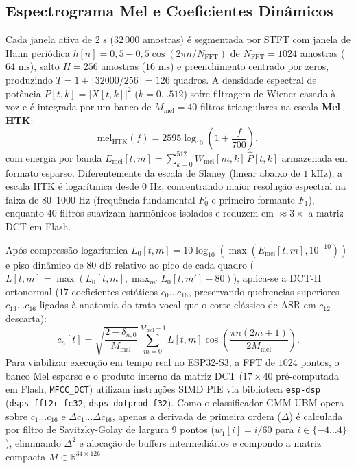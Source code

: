 \documentclass[9pt,technote,a4paper]{IEEEtran}
\begin{document}
\subsection{Espectrograma Mel e Coeficientes Dinâmicos}
Cada janela ativa de $2\text{ s}$ ($32\,000$ amostras) é segmentada por STFT com janela de Hann periódica $h[n] = 0{,}5 - 0{,}5\cos(2\pi n / N_{\mathrm{FFT}})$ de $N_{\mathrm{FFT}} = 1024$ amostras ($64\text{ ms}$), salto $H = 256$ amostras ($16\text{ ms}$) e preenchimento centrado por zeros, produzindo $T = 1 + \lfloor 32000/256 \rfloor = 126$ quadros. A densidade espectral de potência $P[t, k] = |X[t, k]|^2$ ($k = 0\dots 512$) sofre filtragem de Wiener casada à voz e é integrada por um banco de $M_{\mathrm{mel}} = 40$ filtros triangulares na escala \textbf{Mel HTK}:
\begin{equation}
    \mathrm{mel}_{\mathrm{HTK}}(f) = 2595 \log_{10}\!\left(1 + \frac{f}{700}\right),
\end{equation}
com energia por banda $E_{\mathrm{mel}}[t, m] = \sum_{k=0}^{512} W_{\mathrm{mel}}[m, k]\, \hat{P}[t, k]$ armazenada em formato esparso. Diferentemente da escala de Slaney (linear abaixo de $1\text{ kHz}$), a escala HTK é logarítmica desde $0\text{ Hz}$, concentrando maior resolução espectral na faixa de $80\text{--}1000\text{ Hz}$ (frequência fundamental $F_0$ e primeiro formante $F_1$), enquanto $40$ filtros suavizam harmônicos isolados e reduzem em $\approx 3\times$ a matriz DCT em Flash.

Após compressão logarítmica $L_0[t,m] = 10\log_{10}(\max(E_{\mathrm{mel}}[t,m], 10^{-10}))$ e piso dinâmico de $80\text{ dB}$ relativo ao pico de cada quadro ($L[t,m] = \max(L_0[t,m], \max_{m'} L_0[t,m'] - 80)$), aplica-se a DCT-II ortonormal ($17$ coeficientes estáticos $c_0\dots c_{16}$, preservando quefrencias superiores $c_{13}\dots c_{16}$ ligadas à anatomia do trato vocal que o corte clássico de ASR em $c_{12}$ descarta):
\begin{equation}
    c_n[t] = \sqrt{\frac{2-\delta_{n,0}}{M_{\mathrm{mel}}}} \sum_{m=0}^{M_{\mathrm{mel}}-1} L[t, m] \cos\!\left(\frac{\pi n (2m+1)}{2 M_{\mathrm{mel}}}\right).
\end{equation}
Para viabilizar execução em tempo real no ESP32-S3, a FFT de $1024$ pontos, o banco Mel esparso e o produto interno da matriz DCT ($17 \times 40$ pré-computada em Flash, \texttt{MFCC\_DCT}) utilizam instruções SIMD PIE via biblioteca \texttt{esp-dsp} (\texttt{dsps\_fft2r\_fc32}, \texttt{dsps\_dotprod\_f32}). Como o classificador GMM-UBM opera sobre $c_1\dots c_{16}$ e $\Delta c_1\dots \Delta c_{16}$, apenas a derivada de primeira ordem ($\Delta$) é calculada por filtro de Savitzky-Golay de largura $9$ pontos ($w_1[i] = i/60$ para $i \in \{-4\dots 4\}$), eliminando $\Delta^2$ e alocação de buffers intermediários e compondo a matriz compacta $M \in \mathbb{R}^{34 \times 126}$.
\end{document}
